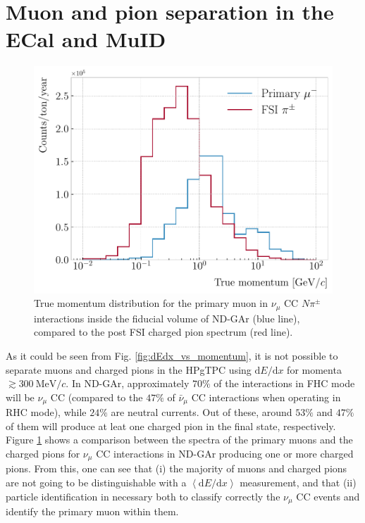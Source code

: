 \section{Muon and pion separation in the ECal and MuID}

\begin{figure}[t]
	\centering
	\includegraphics[width=.70\linewidth]{Images/GArSoft_PID/BDT/ndgar_fhc_numu_cc_mu_spectrum.pdf}
	\caption[True momentum distribution for the primary muon in $\nu_{\mu}$ CC $N\pi^{\pm}$ interactions inside the fiducial volume of ND-GAr, compared to the post FSI charged pion spectrum.]{True momentum distribution for the primary muon in $\nu_{\mu}$ CC $N\pi^{\pm}$ interactions inside the fiducial volume of ND-GAr (blue line), compared to the post FSI charged pion spectrum (red line).}
	\label{fig:primary_muon_spectrum}
\end{figure}

As it could be seen from Fig. \ref{fig:dEdx_vs_momentum}, it is not possible to separate muons and charged pions in the HPgTPC using $\mathrm{d}E/\mathrm{d}x$ for momenta $\gtrsim 300~\mathrm{MeV}/c$. In ND-GAr, approximately $70\%$ of the interactions in FHC mode will be $\nu_{\mu}$ CC (compared to the $47\%$ of $\bar{\nu}_{\mu}$ CC interactions when operating in RHC mode), while $24\%$ are neutral currents. Out of these, around $53\%$ and $47\%$ of them will produce at leat one charged pion in the final state, respectively. Figure \ref{fig:primary_muon_spectrum} shows a comparison between the spectra of the primary muons and the charged pions for $\nu_{\mu}$ CC interactions in ND-GAr producing one or more charged pions. From this, one can see that (i) the majority of muons and charged pions are not going to be distinguishable with a $\left<\mathrm{d}E/\mathrm{d}x\right>$ measurement, and that (ii) particle identification in necessary both to classify correctly the $\nu_{\mu}$ CC events and identify the primary muon within them.

